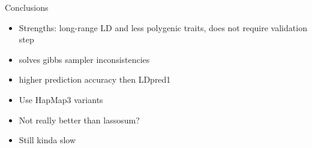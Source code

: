 \documentclass{beamer}
\begin{document}
     \begin{frame}{Conclusions}
        \begin{itemize}
            \item Strengths: long-range LD and less polygenic traits, does not require validation step
            \item solves gibbs sampler inconsistencies
            \item higher prediction accuracy then LDpred1
            \item Use HapMap3 variants
           \newline
           \newline
            \item Not really better than lassosum?
            \item Still kinda slow
        \end{itemize}
       \end{frame}
    

\end{document}
